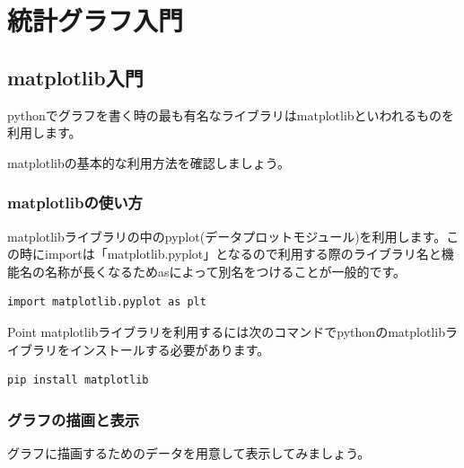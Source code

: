 \chapter{統計グラフ入門}


\section{matplotlib入門}
pythonでグラフを書く時の最も有名なライブラリはmatplotlibといわれるものを利用します。

matplotlibの基本的な利用方法を確認しましょう。

\subsection{matplotlibの使い方}
matplotlibライブラリの中のpyplot(データプロットモジュール)を利用します。この時にimportは「matplotlib.pyplot」となるので利用する際のライブラリ名と機能名の名称が長くなるためasによって別名をつけることが一般的です。

\begin{verbatim}
import matplotlib.pyplot as plt

\end{verbatim}

\begin{hipoint}{Point}
matplotlibライブラリを利用するには次のコマンドでpythonのmatplotlibライブラリをインストールする必要があります。
\begin{verbatim}
pip install matplotlib
\end{verbatim}
\end{hipoint}
\subsection{グラフの描画と表示}
グラフに描画するためのデータを用意して表示してみましょう。


